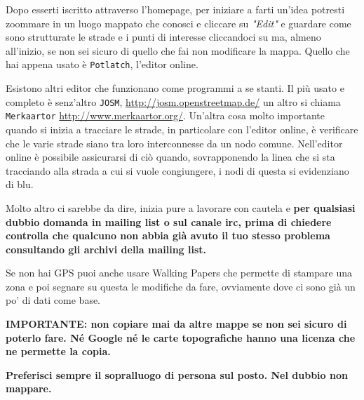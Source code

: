 \documentclass[a4paper,twoside,12pt,]{article}
\newcommand{\gps}{GPS\xspace}
\begin{document}
Dopo esserti iscritto attraverso l'homepage, per iniziare a farti un'idea potresti zoommare in un luogo mappato che conosci e cliccare su \textit{"Edit"} e guardare come sono strutturate le strade e i punti di interesse cliccandoci su ma, almeno all'inizio, se non sei sicuro di quello che fai non modificare la mappa.
Quello che hai appena usato è \texttt{Potlatch}, l'editor online.

Esistono altri editor che funzionano come programmi a se stanti. Il più usato e completo è senz'altro \texttt{JOSM}, \url{http://josm.openstreetmap.de/} un altro si chiama \texttt{Merkaartor} \url{http://www.merkaartor.org/}.
Un'altra cosa molto importante quando si inizia a tracciare le strade, in particolare con l'editor online, è verificare che le varie strade siano tra loro interconnesse da un nodo comune. Nell'editor online è possibile assicurarsi di ciò quando, sovrapponendo la linea che si sta tracciando alla strada a cui si vuole congiungere, i nodi di questa si evidenziano di blu.

Molto altro ci sarebbe da dire, inizia pure a lavorare con cautela e \textbf{per qualsiasi dubbio domanda in mailing list o sul canale irc, prima di chiedere controlla che qualcuno non abbia già avuto il tuo stesso problema consultando gli archivi della mailing list.}

Se non hai \gps puoi anche usare Walking Papers che permette di stampare una zona e poi segnare su questa le modifiche da fare, ovviamente dove ci sono già un po' di dati come base.

\textbf{IMPORTANTE: non copiare mai da altre mappe se non sei sicuro di poterlo fare. Né Google né le carte topografiche hanno una licenza che ne permette la copia.}

\textbf{Preferisci sempre il sopralluogo di persona sul posto. Nel dubbio non mappare.}
\end{document}
